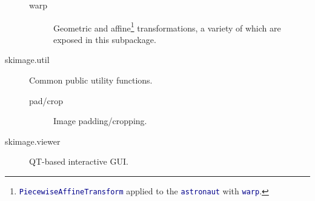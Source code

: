 \documentclass[nohyper, %
               ]{tufte-handout}
\begin{document}
\begin{description}
\begin{description}
      \item[warp] Geometric and affine\footnote[6][0cm]{\textcolor{DarkBlue}{\texttt{PiecewiseAffineTransform}} applied to the \textcolor{DarkBlue}{\texttt{astronaut}} with \textcolor{DarkBlue}{\texttt{warp}}.} transformations, a variety of which are exposed in this subpackage.
    \end{description}
    \item[skimage.util] Common public utility functions.
    \begin{description}
      \item[pad/crop] Image padding/cropping.
    \end{description}
    \item[skimage.viewer] QT-based interactive GUI.
  \end{description}

\newpage


\end{document}
